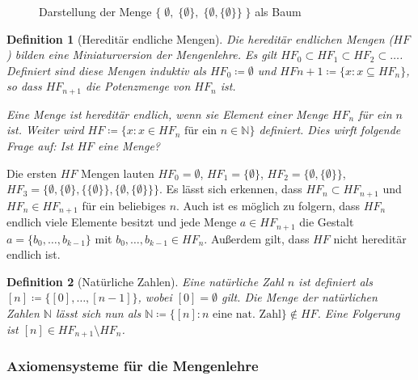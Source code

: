 \documentclass[german]{article}
\theoremstyle{break}
\theoremstyle{def_style}
\newtheorem{definition}{Definition}
\theoremstyle{def_style}
\begin{document}
\begin{figure}[h]
	\begin{center}
	\end{center}
\caption{Darstellung der Menge $\{\; \emptyset, \; \{\emptyset\}, \; \{\emptyset,\{\emptyset\}\}\;\}$ als Baum}
\label{Mengenbaum}
\end{figure}

\begin{definition}[Hereditär endliche Mengen]
	Die hereditär endlichen Mengen ($HF$) bilden eine Miniaturversion der Mengenlehre. Es gilt $HF_0\subset HF_1 \subset HF_2 \subset \dots$. Definiert sind diese Mengen induktiv als $HF_0\coloneqq \emptyset$ und $HF{n+1}\coloneqq \{x : x\subseteq HF_n\}$, so dass $HF_{n+1}$ die Potenzmenge von $HF_n$ ist.
	
	Eine Menge ist hereditär endlich, wenn sie Element einer Menge $HF_n$ für ein $n$ ist. Weiter wird $HF\coloneqq\{x : x \in HF_n \text{ für ein }n\in \mathbb{N}\}$ definiert.
	Dies wirft folgende Frage auf: Ist $HF$ eine Menge? 
\end{definition}

Die ersten $HF$ Mengen lauten $HF_0=\emptyset$, $HF_1=\{\emptyset\}$, $HF_2=\{\emptyset,\{\emptyset\}\}$, $HF_3=\{\emptyset, \{\emptyset\}, \{\{\emptyset\}\}, \{\emptyset,\{\emptyset\}\}\}$. Es lässt sich erkennen, dass $HF_n\subset HF_{n+1}$ und $HF_n\in HF_{n+1}$ für ein beliebiges $n$. Auch ist es möglich zu folgern, dass $HF_n$ endlich viele Elemente besitzt und jede Menge $a\in HF_{n+1}$ die Gestalt $a=\{b_0,\dots,b_{k-1}\}$ mit $b_0,\dots,b_{k-1}\in HF_n$. Außerdem gilt, dass $HF$ nicht hereditär endlich ist.

\begin{definition}[Natürliche Zahlen]
	Eine natürliche Zahl $n$ ist definiert als $[n]\coloneqq\{[0],\dots,[n-1]\}$, wobei $[0]=\emptyset$ gilt. Die Menge der natürlichen Zahlen $\mathbb{N}$ lässt sich nun als $\mathbb{N}\coloneqq\{[n] : n \text{ eine nat. Zahl}\} \notin HF$. Eine Folgerung ist $[n]\in HF_{n+1}\setminus HF_n$.
\end{definition}

\subsubsection{Axiomensysteme für die Mengenlehre}
\end{document}

